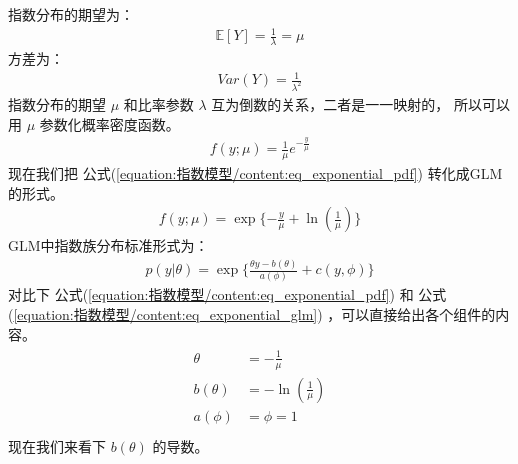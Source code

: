 \documentclass[letterpaper,10pt,english]{sphinxmanual}
\begin{document}
指数分布的期望为：
\begin{equation}\label{equation:指数模型/content:指数模型/content:5}
\begin{split}\mathbb{E}[Y] = \frac{1}{\lambda} = \mu\end{split}
\end{equation}
方差为：
\begin{equation}\label{equation:指数模型/content:指数模型/content:6}
\begin{split}Var(Y) = \frac{1}{\lambda^2}\end{split}
\end{equation}
指数分布的期望 \(\mu\) 和比率参数 \(\lambda\) 互为倒数的关系，二者是一一映射的，
所以可以用 \(\mu\) 参数化概率密度函数。
\begin{equation}\label{equation:指数模型/content:eq_exponential_pdf}
\begin{split}f(y;\mu) = \frac{1}{\mu} e^{- \frac{y}{\mu}}\end{split}
\end{equation}
现在我们把 公式(\ref{equation:指数模型/content:eq_exponential_pdf}) 转化成GLM的形式。
\begin{equation}\label{equation:指数模型/content:指数模型/content:7}
\begin{split}f(y;\mu)= \exp \{ - \frac{y}{\mu} + \ln \left ( \frac{1}{\mu} \right )     \}\end{split}
\end{equation}
GLM中指数族分布标准形式为：
\begin{equation}\label{equation:指数模型/content:eq_exponential_glm}
\begin{split}p(y|\theta) = \exp \{\frac{\theta y - b(\theta)}{a(\phi)} + c(y,\phi)\}\end{split}
\end{equation}
对比下 公式(\ref{equation:指数模型/content:eq_exponential_pdf})  和 公式(\ref{equation:指数模型/content:eq_exponential_glm})
，可以直接给出各个组件的内容。
\begin{align}\label{equation:指数模型/content:指数模型/content:8}\!\begin{aligned}
\theta &= - \frac{1}{\mu}\\
b(\theta) &= - \ln \left ( \frac{1}{\mu} \right )\\
a(\phi) &= \phi= 1\\
\end{aligned}\end{align}
现在我们来看下 \(b(\theta)\) 的导数。
\end{document}
